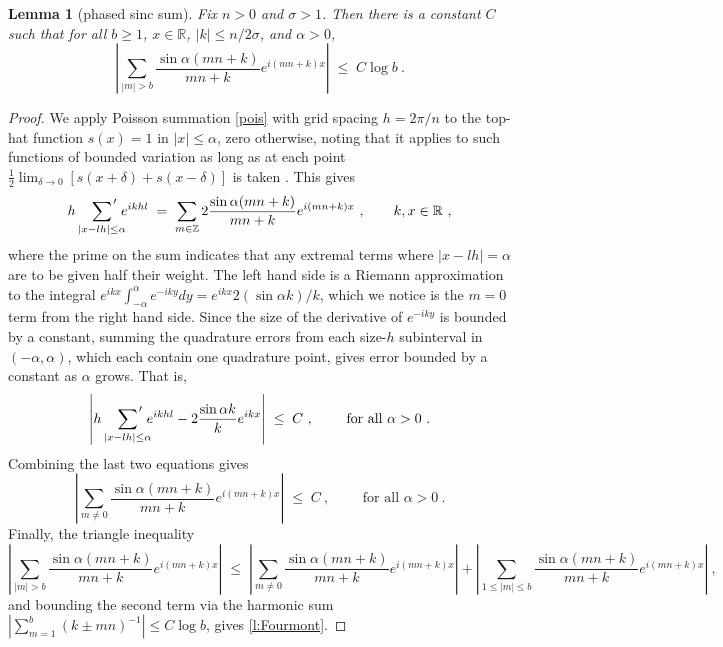 \documentclass[10pt]{article}
\newcommand{\be}{\begin{equation}}
\newcommand{\ee}{\end{equation}}
\newcommand{\RR}{\mathbb{R}}
\newcommand{\ZZ}{\mathbb{Z}}
\newtheorem{lem}[thm]{Lemma}
\newcommand{\rat}{\sigma}          %
\newcommand{\al}{\alpha}           %
\begin{document}
\begin{lem}[phased sinc sum]  %
  Fix $n>0$ and $\rat>1$.
  Then there is a constant $C$
  such that for all $b\ge 1$,  $x\in\RR$, $|k|\le n/2\sigma$, and $\al>0$,
  \be
  \left|
  \sum_{|m|>b} \frac{\sin \al (mn+k)}{mn+k} e^{i(mn+k)x}
  \right|
  \; \le \; C\log b~.
  \ee
\label{l:Fourmont}
\end{lem}
\begin{proof}
  We apply Poisson summation \eqref{pois}
with grid spacing $h=2\pi/n$ to
  the top-hat function $s(x) = 1$ in $|x|\le \al$, zero otherwise,
  noting that it applies to such functions of bounded variation
  as long as at each
  point $\frac{1}{2}\lim_{\delta\to0} [s(x+\delta) + s(x-\delta)]$ is taken
  \cite[\S 11.22]{apostol}.
  This gives
  $$
  h \sum_{|x-lh|\le \al} \hspace{-2.5ex}{\vphantom{\sum}}'  %
  \;e^{ikhl}  
  \;=\;
  \sum_{m\in\ZZ} 2 \frac{\sin \al (mn+k)}{mn+k} e^{i(mn+k)x}
  ~,\qquad k, x\in\RR~,
  $$
  where the prime on the sum indicates that any extremal terms
  where $|x-lh|=\al$ are to be given half their weight.
  The left hand side is a Riemann approximation to the integral
  $e^{ikx}\int_{-\al}^\al e^{-iky} dy = e^{ikx} 2 (\sin \al k) / k$,
  which we notice is the $m=0$ term from the right hand side.
  Since the size of the derivative of $e^{-iky}$ is bounded by a constant,
  summing the quadrature errors from each size-$h$ subinterval in $(-\al,\al)$,
  which each contain one quadrature point,
  gives error bounded by a constant as $\al$ grows.
  That is,
  $$
  \left | h \sum_{|x-lh|\le \al} \hspace{-2.5ex}{\vphantom{\sum}}'
  \;e^{ikhl} - 2 \frac{\sin \al k}{k} e^{ikx} \right |
  \; \le \; C
  ~, \qquad \mbox{ for all } \al>0~.
  $$
  Combining the last two equations gives
  $$
  \left|
  \sum_{m\neq 0} %
  \frac{\sin \al (mn+k)}{mn+k} e^{i(mn+k)x}
  \right|
  \; \le \; C
  ~, \qquad \mbox{ for all } \al>0~.
  $$
  Finally, the triangle inequality
  $$
  \left|
  \sum_{|m|> b} \frac{\sin \al (mn+k)}{mn+k} e^{i(mn+k)x}
  \right|
  \; \le \; 
  \left|
  \sum_{m\neq 0} \frac{\sin \al (mn+k)}{mn+k} e^{i(mn+k)x}
  \right|
+
    \left|
  \sum_{1\le|m|\le b} \frac{\sin \al (mn+k)}{mn+k} e^{i(mn+k)x}
  \right|~,
  $$
  and bounding the second term via the harmonic sum
  $|\sum_{m=1}^b (k\pm mn)^{-1}| \le C \log b$, gives \eqref{l:Fourmont}.
\end{proof}
\end{document}
